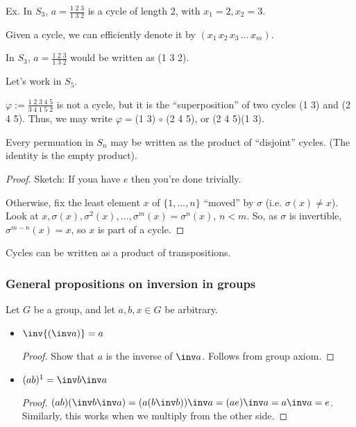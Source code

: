 \documentclass[notes.tex]{subfiles}
\begin{document}
\vspace{0.5em}
Ex. In $S_3$, $a = \frac{1\;2\;3}{1\;3\;2}$ is a cycle of length 2, with $x_1 = 2, x_2= 3$.

\begin{notation}
	Given a cycle, we can efficiently denote it by $(x_1\,x_2\,x_3\,\ldots\,x_m)$.
\end{notation}

\begin{eg}
	In $S_3$, $a = \frac{1\;2\;3}{1\;3\;2}$ would be written as (1 3 2).
\end{eg}

Let's work in $S_5$.

$\varphi := \frac{1\;2\;3\;4\;5}{3\;4\;1\;5\;2}$ is not a cycle, but it is the ``superposition'' of two cycles (1 3) and (2 4 5). Thus, we may write $\varphi = $(1 3) $\circ$ (2 4 5), or (2 4 5)(1 3).

\begin{theorem}
	Every permuation in $S_n$ may be written as the product of ``disjoint'' cycles. (The identity is the empty product).
\end{theorem}

\begin{proof}
	Sketch:
	If youa have $e$ then you're done trivially.

	Otherwise, fix the least element $x$ of $\{1, \ldots, n\}$ ``moved'' by $\sigma$ (i.e. $\sigma(x)\ne x$).
	Look at $x, \sigma(x), \sigma^2(x), \ldots, \sigma^m(x) = \sigma^n(x)$, $n<m$.
	So, as $\sigma$ is invertible, $\sigma^{m-n}(x) = x$, so $x$ is part of a cycle.
\end{proof}

\begin{theorem}
	Cycles can be written as a product of transpositions.
\end{theorem}

\subsubsection*{General propositions on inversion in groups}

Let $G$ be a group, and let $a, b, x\in G$ be arbitrary.

\begin{itemize}
	\item $\inv{(\inv a)} = a$
	\begin{proof}
		Show that $a$ is the inverse of $\inv a$.
		Follows from group axiom.
	\end{proof}
	\item $(ab)^{1} = \inv b \inv a$
	\begin{proof}
		$(ab)(\inv b \inv a) = (a(b\inv b)) \inv a  = (a e) \inv a = a \inv a = e$.
		Similarly, this works when we multiply from the other side.
	\end{proof}
\end{itemize}
\end{document}
